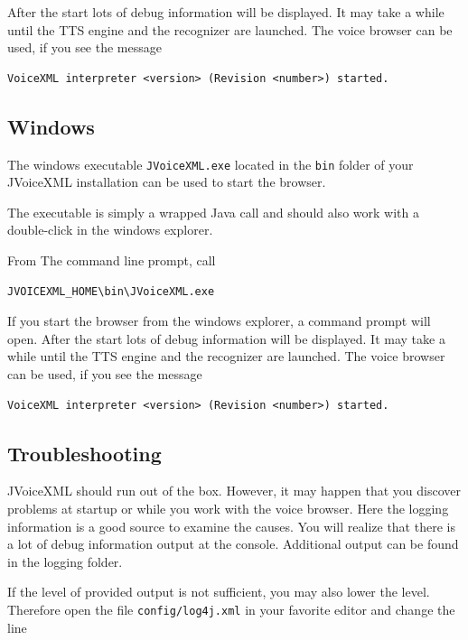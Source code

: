 \documentclass[11pt,a4paper]{book}
\begin{document}
After the start lots of debug information will be displayed.
It may take a while until the TTS engine and the recognizer are launched.
The voice browser can be used, if you see the message

\begin{lstlisting}
VoiceXML interpreter <version> (Revision <number>) started.
\end{lstlisting}

\subsection{Windows}

The windows executable \texttt{JVoiceXML.exe} located in the \texttt{bin}
folder of your JVoiceXML installation can be used to start the browser.

The executable is simply a wrapped Java call and should also work with a
double-click in the windows explorer.

From The command line prompt, call

\begin{lstlisting}
JVOICEXML_HOME\bin\JVoiceXML.exe
\end{lstlisting}

If you start the browser from the windows explorer, a command prompt will open.
After the start lots of debug information will be displayed.
It may take a while until the TTS engine and the recognizer are launched.
The voice browser can be used, if you see the message

\begin{lstlisting}
VoiceXML interpreter <version> (Revision <number>) started.
\end{lstlisting}

\subsection{Troubleshooting}

JVoiceXML should run out of the box. However, it may happen that you discover
problems at startup or while you work with the voice browser. Here the logging
information is a good source to examine the causes. You will realize that there
is a lot of debug information output at the console. Additional output can be
found in the logging folder.

If the level of provided output is not sufficient, you may also lower the level.
Therefore open the file \lstinline{config/log4j.xml} in your favorite editor
and change the line
\end{document}
